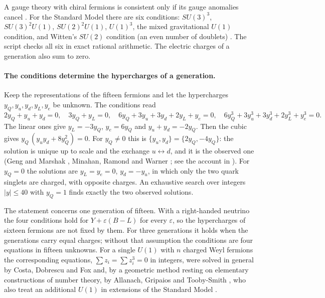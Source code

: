 \documentclass[11pt]{article}
\begin{document}
\noindent
A gauge theory with chiral fermions is consistent only if its gauge anomalies cancel \cite{Weinberg}.
For the Standard Model there are six conditions: $SU(3)^3$, $SU(3)^2U(1)$, $SU(2)^2U(1)$, $U(1)^3$, the mixed gravitational $U(1)$ condition, and Witten's $SU(2)$ condition (an even number of doublets) \cite{Witten}.
The script  checks all six in exact rational arithmetic.
The electric charges of a generation also sum to zero.

\paragraph{The conditions determine the hypercharges of a generation.}
Keep the representations of the fifteen fermions and let the hypercharges $y_Q,y_u,y_d,y_L,y_e$ be unknown.
The conditions read
\[
  2y_Q+y_u+y_d = 0,\quad 3y_Q+y_L=0,\quad 6y_Q+3y_u+3y_d+2y_L+y_e = 0,\quad 6y_Q^3+3y_u^3+3y_d^3+2y_L^3+y_e^3 = 0.
\]
The linear ones give $y_L=-3y_Q$, $y_e = 6y_Q$ and $y_u+y_d=-2y_Q$.
Then the cubic gives $y_Q\,(y_uy_d + 8y_Q^2) = 0$.
For $y_Q\ne0$ this is $\{y_u,y_d\} = \{2y_Q,-4y_Q\}$: the solution is unique up to scale and the exchange $u\leftrightarrow d$, and it is the observed one (Geng and Marshak \cite{GengMarshak}, Minahan, Ramond and Warner \cite{MRW}; see the account in \cite{LohitsiriTong}).
For $y_Q=0$ the solutions are $y_L=y_e=0$, $y_d=-y_u$, in which only the two quark singlets are charged, with opposite charges.
An exhaustive search over integers $|y|\le40$ with $y_Q = 1$ finds exactly the two observed solutions.

The statement concerns one generation of fifteen.
With a right-handed neutrino the four conditions hold for $Y+\varepsilon(B-L)$ for every $\varepsilon$, so the hypercharges of sixteen fermions are not fixed by them.
For three generations it holds when the generations carry equal charges; without that assumption the conditions are four equations in fifteen unknowns.
For a single $U(1)$ with $n$ charged Weyl fermions the corresponding equations, $\sum z_i = \sum z_i^3 = 0$ in integers, were solved in general by Costa, Dobrescu and Fox \cite{CDF} and, by a geometric method resting on elementary constructions of number theory, by Allanach, Gripaios and Tooby-Smith \cite{AGT}, who also treat an additional $U(1)$ in extensions of the Standard Model \cite{AGT2}.
\end{document}
